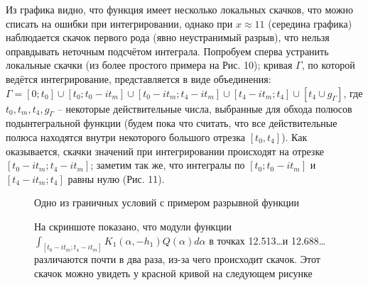 \documentclass[a4paper, 12pt]{article}
\begin{document}
Из графика видно, что функция имеет несколько локальных скачков, что можно списать на ошибки при интегрировании, однако при $x \approx 11$ (середина графика) наблюдается скачок первого рода (явно неустранимый разрыв), что нельзя оправдывать неточным подсчётом интеграла. Попробуем сперва устранить локальные скачки (из более простого примера на Рис. 10); кривая $\Gamma$, по которой ведётся интегрирование, представляется в виде объединения: $\Gamma=[0;t_0] \cup [t_0;t_0-i t_m] \cup [t_0 - i t_m; t_4 - i t_m] \cup [t_4-i t_m; t_4]\cup [t_4 \cup g_{\Gamma}]$, где $t_0,t_m,t_4,g_{\Gamma}$ -- некоторые действительные числа, выбранные для обхода полюсов подынтегральной функции (будем пока что считать, что все действительные полюса находятся внутри некоторого большого отрезка $[t_0,t_4]$). Как оказывается, скачки значений при интегрировании происходят на отрезке $[t_0 - i t_m; t_4 - i t_m]$; заметим так же, что интегралы по $[t_0;t_0-i t_m]$ и $[t_4-i t_m; t_4]$ равны нулю (Рис. 11).
\begin{figure}[h!]
\noindent{}
\caption{Одно из граничных условий с примером разрывной функции}
\label{figCurves}
\end{figure}
\begin{figure}[h!]
\noindent{}
\caption{На скриншоте показано, что модули функции $\int_{[t_0 - i t_m; t_4 - i t_m]} K_1(\alpha,-h_1)Q(\alpha) d\alpha$ в точках 12.513\dots и 12.688\dots различаются почти в два раза, из-за чего происходит скачок. Этот скачок можно увидеть у красной кривой на следующем рисунке}
\label{figCurves}
\end{figure}
\end{document}
